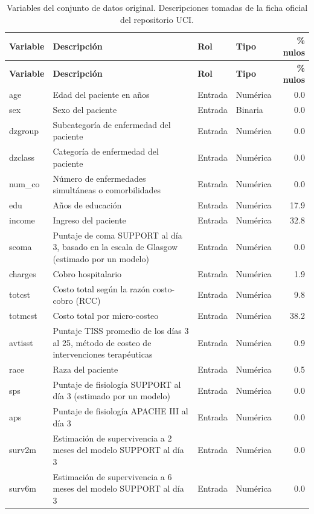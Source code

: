 \begin{longtable}{p{1.7cm} p{5.1cm} p{1.4cm} p{1.6cm} r}
\caption{Variables del conjunto de datos original. Descripciones tomadas de la ficha oficial del repositorio UCI.}
\label{tab:variables}\\
\toprule
\textbf{Variable} & \textbf{Descripción} & \textbf{Rol} & \textbf{Tipo} & \textbf{\% nulos} \\
\midrule
\endfirsthead
\toprule
\textbf{Variable} & \textbf{Descripción} & \textbf{Rol} & \textbf{Tipo} & \textbf{\% nulos} \\
\midrule
\endhead
\bottomrule
\endfoot
age & Edad del paciente en años & Entrada & Numérica & 0.0 \\
sex & Sexo del paciente & Entrada & Binaria & 0.0 \\
dzgroup & Subcategoría de enfermedad del paciente & Entrada & Numérica & 0.0 \\
dzclass & Categoría de enfermedad del paciente & Entrada & Numérica & 0.0 \\
num\_co & Número de enfermedades simultáneas o comorbilidades & Entrada & Numérica & 0.0 \\
edu & Años de educación & Entrada & Numérica & 17.9 \\
income & Ingreso del paciente & Entrada & Numérica & 32.8 \\
scoma & Puntaje de coma SUPPORT al día 3, basado en la escala de Glasgow (estimado por un modelo) & Entrada & Numérica & 0.0 \\
charges & Cobro hospitalario & Entrada & Numérica & 1.9 \\
totcst & Costo total según la razón costo-cobro (RCC) & Entrada & Numérica & 9.8 \\
totmcst & Costo total por micro-costeo & Entrada & Numérica & 38.2 \\
avtisst & Puntaje TISS promedio de los días 3 al 25, método de costeo de intervenciones terapéuticas & Entrada & Numérica & 0.9 \\
race & Raza del paciente & Entrada & Numérica & 0.5 \\
sps & Puntaje de fisiología SUPPORT al día 3 (estimado por un modelo) & Entrada & Numérica & 0.0 \\
aps & Puntaje de fisiología APACHE III al día 3 & Entrada & Numérica & 0.0 \\
surv2m & Estimación de supervivencia a 2 meses del modelo SUPPORT al día 3 & Entrada & Numérica & 0.0 \\
surv6m & Estimación de supervivencia a 6 meses del modelo SUPPORT al día 3 & Entrada & Numérica & 0.0 \\

\end{longtable}
